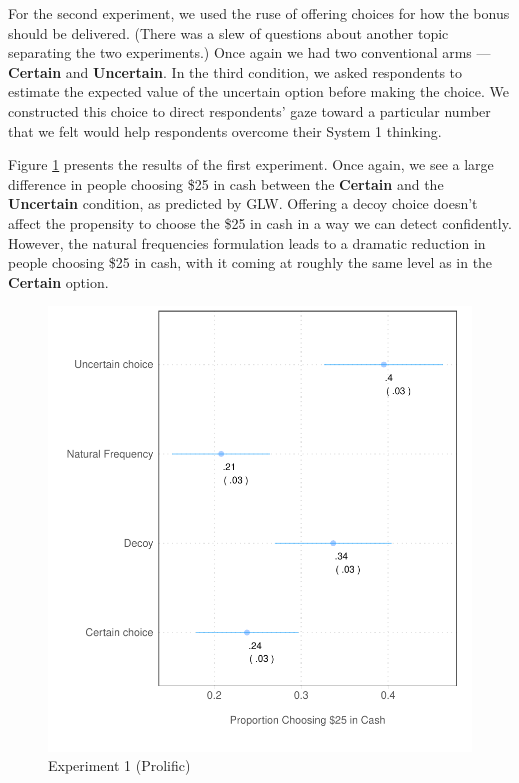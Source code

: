 \documentclass[12pt, letterpaper]{article}
\begin{document}
For the second experiment, we used the ruse of offering choices for how the bonus should be delivered. (There was a slew of questions about another topic separating the two experiments.) Once again we had two conventional arms --- \textbf{Certain} and \textbf{Uncertain}. In the third condition, we asked respondents to estimate the expected value of the uncertain option before making the choice. We constructed this choice to direct respondents' gaze toward a particular number that we felt would help respondents overcome their System 1 thinking.

Figure \ref{fig:exp_1_prolific} presents the results of the first experiment. Once again, we see a large difference in people choosing \$25 in cash between the \textbf{Certain} and the \textbf{Uncertain} condition, as predicted by GLW. Offering a decoy choice doesn't affect the propensity to choose the \$25 in cash in a way we can detect confidently. However, the natural frequencies formulation leads to a dramatic reduction in people choosing \$25 in cash, with it coming at roughly the same level as in the \textbf{Certain} option.

\begin{figure}[h]
    \centering
    \includegraphics{figs/prolific_exp1.pdf}
    \caption{Experiment 1 (Prolific)}
    \label{fig:exp_1_prolific}
\end{figure}
\end{document}
